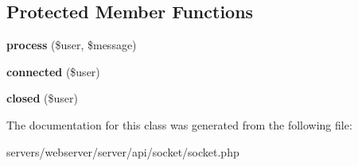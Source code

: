 \subsection*{Protected Member Functions}
\begin{DoxyCompactItemize}
\item 
\mbox{\label{class_lora_1_1_api_1_1echo_server_a805b6933fa0b69978e35fe94f3884de7}} 
{\bfseries process} (\$user, \$message)
\item 
\mbox{\label{class_lora_1_1_api_1_1echo_server_a3e89014762456a67edbe843811c78736}} 
{\bfseries connected} (\$user)
\item 
\mbox{\label{class_lora_1_1_api_1_1echo_server_aaf6375ec8ee41584a5adcf3d85d73018}} 
{\bfseries closed} (\$user)
\end{DoxyCompactItemize}


The documentation for this class was generated from the following file\+:\begin{DoxyCompactItemize}
\item 
servers/webserver/server/api/socket/socket.\+php\end{DoxyCompactItemize}
